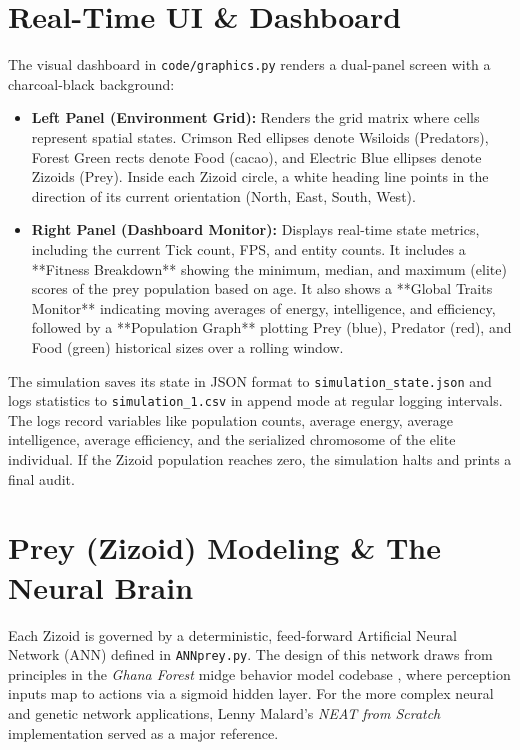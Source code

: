 \documentclass[11pt,a4paper]{article}
\begin{document}
\section{Real-Time UI \& Dashboard}

The visual dashboard in \texttt{code/graphics.py} renders a dual-panel screen with a charcoal-black background:
\begin{itemize}
    \item \textbf{Left Panel (Environment Grid):} Renders the grid matrix where cells represent spatial states. Crimson Red ellipses denote Wsiloids (Predators), Forest Green rects denote Food (cacao), and Electric Blue ellipses denote Zizoids (Prey). Inside each Zizoid circle, a white heading line points in the direction of its current orientation (North, East, South, West).
    \item \textbf{Right Panel (Dashboard Monitor):} Displays real-time state metrics, including the current Tick count, FPS, and entity counts. It includes a **Fitness Breakdown** showing the minimum, median, and maximum (elite) scores of the prey population based on age. It also shows a **Global Traits Monitor** indicating moving averages of energy, intelligence, and efficiency, followed by a **Population Graph** plotting Prey (blue), Predator (red), and Food (green) historical sizes over a rolling window.
\end{itemize}
The simulation saves its state in JSON format to \texttt{simulation\_state.json} and logs statistics to \texttt{simulation\_1.csv} in append mode at regular logging intervals. The logs record variables like population counts, average energy, average intelligence, average efficiency, and the serialized chromosome of the elite individual. If the Zizoid population reaches zero, the simulation halts and prints a final audit.

\section{Prey (Zizoid) Modeling \& The Neural Brain}

Each Zizoid is governed by a deterministic, feed-forward Artificial Neural Network (ANN) defined in \texttt{ANNprey.py}. The design of this network draws from principles in the \textit{Ghana Forest} midge behavior model codebase \cite{ghanaforest}, where perception inputs map to actions via a sigmoid hidden layer. For the more complex neural and genetic network applications, Lenny Malard's \textit{NEAT from Scratch} implementation \cite{neatfromscratch} served as a major reference.
\end{document}
